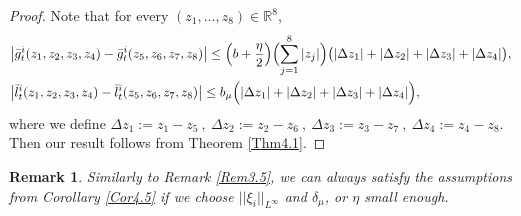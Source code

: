 \documentclass[10pt,a4paper]{article}
\theoremstyle{plain}
\newtheorem{Remark}[Theorem]{Remark}
\theoremstyle{definition}
\numberwithin{equation}{section}
\begin{document}
\begin{proof} 

Note that for every $(z_{1},...,z_{8}) \in \mathbb{R}^{8}$, 
\begin{align*}
&\big|\bar{g}_{t}^{i}(z_{1},z_{2},z_{3},z_{4})-\bar{g}_{t}^{i}(z_{5},z_{6},z_{7},z_{8})\big| \leq \Bigl(b+\frac{\eta}{2}\Bigr)\Bigl(\sum_{j=1}^{8}|z_{j}|\Bigr)\big(|\Delta z_{1}|+|\Delta z_{2}|+|\Delta z_{3}|+|\Delta z_{4}|\big),\\
&\big|\bar{l}_{t}^{i}(z_{1},z_{2},z_{3},z_{4})-\bar{l}_{t}^{i}(z_{5},z_{6},z_{7},z_{8})\big| \leq b_{\mu}\Bigl(|\Delta z_{1}|+|\Delta z_{2}|+|\Delta z_{3}|+|\Delta z_{4}| \Bigr),
\end{align*}
where we define
$
\Delta z_{1}:=z_{1}-z_{5} \ , \ \Delta z_{2}:=z_{2}-z_{6} \ , \ \Delta z_{3}:=z_{3}-z_{7} \ , \ \Delta z_{4}:=z_{4}-z_{8}.
$
Then our result follows from Theorem \ref{Thm4.1}. 


\end{proof}

\begin{Remark}
Similarly to Remark \ref{Rem3.5}, we can always satisfy the assumptions from Corollary \ref{Cor4.5} if we choose $||\xi_{i}||_{L^{\infty}}$ and $\delta_{\mu}$, or $\eta$ small enough.
\end{Remark}
\end{document}
